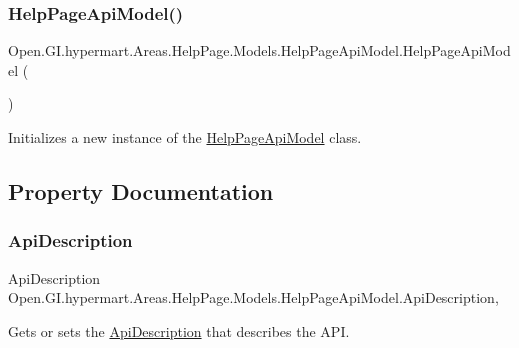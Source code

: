 \subsubsection{\texorpdfstring{Help\+Page\+Api\+Model()}{HelpPageApiModel()}}
{\footnotesize\ttfamily Open.\+G\+I.\+hypermart.\+Areas.\+Help\+Page.\+Models.\+Help\+Page\+Api\+Model.\+Help\+Page\+Api\+Model (\begin{DoxyParamCaption}{ }\end{DoxyParamCaption})}



Initializes a new instance of the \hyperlink{class_open_1_1_g_i_1_1hypermart_1_1_areas_1_1_help_page_1_1_models_1_1_help_page_api_model}{Help\+Page\+Api\+Model} class. 



\subsection{Property Documentation}
\hypertarget{class_open_1_1_g_i_1_1hypermart_1_1_areas_1_1_help_page_1_1_models_1_1_help_page_api_model_a80061bc5f25f38dbfbff06705a48372e}{}\label{class_open_1_1_g_i_1_1hypermart_1_1_areas_1_1_help_page_1_1_models_1_1_help_page_api_model_a80061bc5f25f38dbfbff06705a48372e} 
\subsubsection{\texorpdfstring{Api\+Description}{ApiDescription}}
{\footnotesize\ttfamily Api\+Description Open.\+G\+I.\+hypermart.\+Areas.\+Help\+Page.\+Models.\+Help\+Page\+Api\+Model.\+Api\+Description\hspace{0.3cm}{\ttfamily [get]}, {\ttfamily [set]}}



Gets or sets the \hyperlink{class_open_1_1_g_i_1_1hypermart_1_1_areas_1_1_help_page_1_1_models_1_1_help_page_api_model_a80061bc5f25f38dbfbff06705a48372e}{Api\+Description} that describes the A\+PI. 

\hypertarget{class_open_1_1_g_i_1_1hypermart_1_1_areas_1_1_help_page_1_1_models_1_1_help_page_api_model_a318df386bf722bfbafab9a6f2812641e}{}\label{class_open_1_1_g_i_1_1hypermart_1_1_areas_1_1_help_page_1_1_models_1_1_help_page_api_model_a318df386bf722bfbafab9a6f2812641e} 
